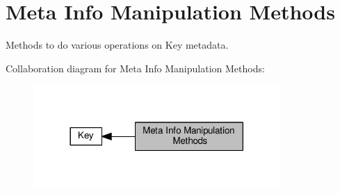 \hypertarget{group__keymeta}{}\section{Meta Info Manipulation Methods}
\label{group__keymeta}


Methods to do various operations on Key metadata.  


Collaboration diagram for Meta Info Manipulation Methods\+:
\nopagebreak
\begin{figure}[H]
\begin{center}
\leavevmode
\includegraphics[width=266pt]{group__keymeta}
\end{center}
\end{figure}
